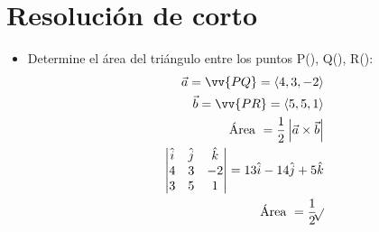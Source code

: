 \section{Resolución de corto}
\begin{itemize}
    \item Determine el área del triángulo entre los puntos P(), Q(), R():
        \begin{align*}
            \vec{a} = \vv{PQ} = \left\langle 4,3,-2 \right\rangle \\ 
            \vec{b} = \vv{PR} = \left\langle 5,5,1 \right\rangle \\ 
            \text{  Área  } = \frac{1}{2} \left| \vec{a} \times  \vec{b} \right| \\ 
            \begin{vmatrix}
                \hat{i} & \hat{j} & \hat{k} \\ 
                4 & 3 & -2 \\ 
                3 & 5 & 1 \\ 
            \end{vmatrix} = 13 \hat{i} - 14 \hat{j} + 5 \hat{k} \\  
            \text{  Área  } = \frac{1}{2} \sqrt[]{} \\ 
        \end{align*}

\end{itemize}
    



